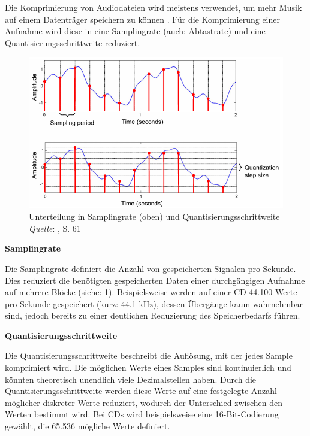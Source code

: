 Die Komprimierung von Audiodateien wird meistens verwendet, um mehr Musik auf einem Datenträger speichern zu können \parencite{what_is_audio_compression}. Für die Komprimierung einer Aufnahme wird diese in eine Samplingrate (auch: Abtastrate) und eine Quantisierungsschrittweite reduziert.

%
\begin{figure}[h]
    \includegraphics[width=1\textwidth]{images/Samplingrate_Quantisierungsgröße.PNG}
    \caption{Unterteilung in Samplingrate (oben) und Quantisierungsschrittweite\\\hspace{\textwidth}\textit{Quelle}: \cite{fundamentals_of_music_processing}, S. 61}
    \label{fig:samplingrate}
\end{figure}
%

%
\textbf{Samplingrate}
%

Die Samplingrate definiert die Anzahl von gespeicherten Signalen pro Sekunde.
Dies reduziert die benötigten gespeicherten Daten einer durchgängigen Aufnahme auf mehrere Blöcke (siehe: \cref{fig:samplingrate}).
Beispielsweise werden auf einer CD 44.100 Werte pro Sekunde gespeichert (kurz: 44.1 kHz), dessen Übergänge kaum wahrnehmbar sind, jedoch bereits zu einer deutlichen Reduzierung des Speicherbedarfs führen.

%
\textbf{Quantisierungsschrittweite}
%

Die Quantisierungsschrittweite beschreibt die Auflösung, mit der jedes Sample komprimiert wird.
Die möglichen Werte eines Samples sind kontinuierlich und könnten theoretisch unendlich viele Dezimalstellen haben.
Durch die Quantisierungsschrittweite werden diese Werte auf eine festgelegte Anzahl möglicher diskreter Werte reduziert, wodurch der Unterschied zwischen den Werten bestimmt wird.
Bei CDs wird beispielsweise eine 16-Bit-Codierung gewählt, die 65.536 mögliche Werte definiert.

